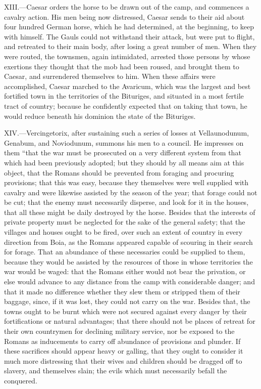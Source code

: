 XIII.—Caesar orders the horse to be drawn out of the camp, and
commences a cavalry action. His men being now distressed, Caesar sends
to their aid about four hundred German horse, which he had determined,
at the beginning, to keep with himself. The Gauls could not withstand
their attack, but were put to flight, and retreated to their main body,
after losing a great number of men. When they were routed, the townsmen,
again intimidated, arrested those persons by whose exertions they
thought that the mob had been roused, and brought them to Caesar, and
surrendered themselves to him. When these affairs were accomplished,
Caesar marched to the Avaricum, which was the largest and best fortified
town in the territories of the Bituriges, and situated in a most fertile
tract of country; because he confidently expected that on taking that
town, he would reduce beneath his dominion the state of the Bituriges.

XIV.—Vercingetorix, after sustaining such a series of losses at
Vellaunodunum, Genabum, and Noviodunum, summons his men to a council. He
impresses on them ``that the war must be prosecuted on a very different
system from that which had been previously adopted; but they should by
all means aim at this object, that the Romans should be prevented from
foraging and procuring provisions; that this was easy, because they
themselves were well supplied with cavalry and were likewise assisted by
the season of the year; that forage could not be cut; that the enemy
must necessarily disperse, and look for it in the houses, that all these
might be daily destroyed by the horse. Besides that the interests of
private property must be neglected for the sake of the general safety;
that the villages and houses ought to be fired, over such an extent of
country in every direction from Boia, as the Romans appeared capable of
scouring in their search for forage. That an abundance of these
necessaries could be supplied to them, because they would be assisted by
the resources of those in whose territories the war would be waged: that
the Romans either would not bear the privation, or else would advance to
any distance from the camp with considerable danger; and that it made no
difference whether they slew them or stripped them of their baggage,
since, if it was lost, they could not carry on the war. Besides that,
the towns ought to be burnt which were not secured against every danger
by their fortifications or natural advantages; that there should not be
places of retreat for their own countrymen for declining military
service, nor be exposed to the Romans as inducements to carry off
abundance of provisions and plunder. If these sacrifices should appear
heavy or galling, that they ought to consider it much more distressing
that their wives and children should be dragged off to slavery, and
themselves slain; the evils which must necessarily befall the conquered.

